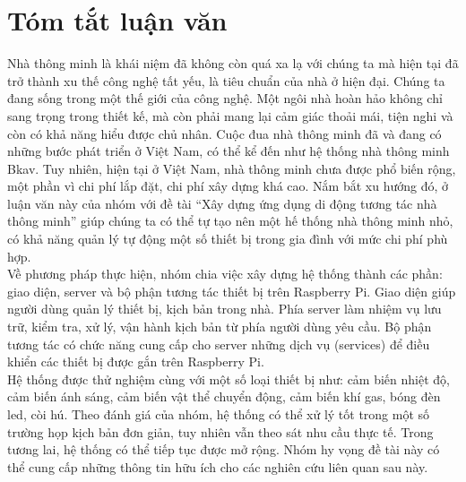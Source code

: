 \documentclass[12pt,a4paper,oneside]{extbook}
\begin{document}
\chapter*{Tóm tắt luận văn}
\noindent
Nhà thông minh là khái niệm đã không còn quá xa lạ với chúng ta mà hiện tại 
đã trở thành xu thế công nghệ tất yếu, là tiêu chuẩn của nhà ở hiện đại. 
Chúng ta đang sống trong một thế giới của công nghệ. Một ngôi nhà hoàn hảo 
không chỉ sang trọng trong thiết kế, mà còn phải mang lại cảm giác thoải mái, tiện nghi và còn có khả năng hiểu được chủ nhân. Cuộc đua nhà thông minh đã và đang có những bước phát triển ở Việt Nam, có thể kể đến như hệ thống nhà thông minh Bkav. Tuy nhiên, hiện tại ở Việt Nam, nhà thông minh chưa được phổ biến rộng, một phần vì chi phí lắp đặt, chi phí xây dựng khá cao. Nắm bắt xu hướng đó, ở luận văn này của nhóm với đề tài “Xây dựng ứng dụng di động tương tác nhà thông minh” giúp chúng ta có thể tự tạo nên một hế thống nhà thông minh nhỏ, có khả năng quản lý tự động một số thiết bị trong gia đình với mức chi phí phù hợp.\\

\noindent
Về phương pháp thực hiện, nhóm chia việc xây dựng hệ thống thành các phần: giao diện, server và bộ phận tương tác thiết bị trên Raspberry Pi. Giao diện giúp người dùng quản lý thiết bị, kịch bản trong nhà. Phía server làm nhiệm vụ lưu trữ, kiểm tra, xử lý, vận hành kịch bản từ phía người dùng yêu cầu. Bộ phận tương tác có chức năng cung cấp cho server những dịch vụ (services) để điều khiển các thiết bị được gắn trên Raspberry Pi.\\

\noindent
Hệ thống được thử nghiệm cùng với một số loại thiết bị như: cảm biến nhiệt độ, cảm biến ánh sáng, cảm biến vật thể chuyển động, cảm biến khí gas, bóng đèn led, còi hú. Theo đánh giá của nhóm, hệ thống có thể xử lý tốt trong một số trường họp kịch bản đơn giản, tuy nhiên vẫn theo sát nhu cầu thực tế. Trong tương lai, hệ thống có thể tiếp tục được mở rộng. Nhóm hy vọng đề tài này có thể cung cấp những thông tin hữu ích cho các nghiên cứu liên quan sau này.

\begingroup
\let\cleardoublepage\clearpage
\tableofcontents 
% 
\endgroup

\renewcommand{\listtablename}{Danh mục bảng}
\listoftables
{}
\end{document}
